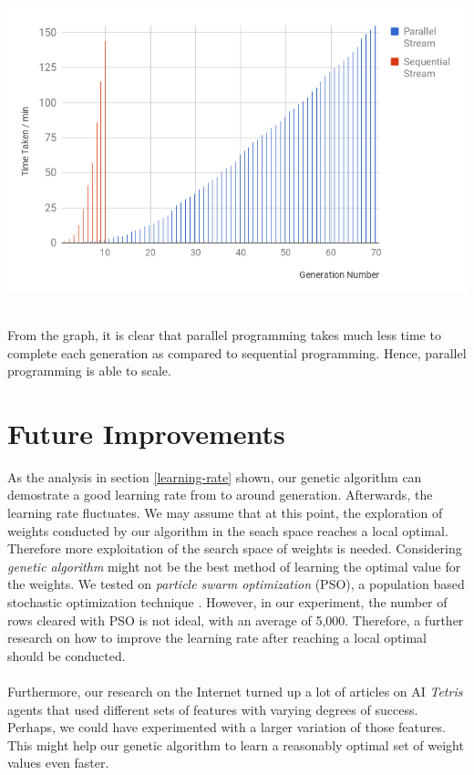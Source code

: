 \documentclass{article} %
\begin{document}
\begin{multicols}{2}
\begin{center}
\begin{minipage}{1.0\linewidth}
\includegraphics[width=\linewidth]{para_seq.png}
\end{minipage}
\end{center}

\noindent
\\
From the graph, it is clear that parallel programming takes much less time to complete each generation as compared to sequential programming. Hence, parallel programming is able to scale.

\section{Future Improvements}
As the analysis in section \ref{learning-rate} shown, our genetic algorithm can demostrate a good learning rate from  to around  generation. Afterwards, the learning rate fluctuates. We may assume that at this point, the exploration of weights conducted by our algorithm in the seach space reaches a local optimal.  Therefore more exploitation of the search space of weights is needed. Considering \textsl{genetic algorithm} might not be the best method of learning the optimal value for the weights. We tested on \textsl{particle swarm optimization} (PSO), a population based stochastic optimization technique \cite{PSO}. However, in our experiment, the number of rows cleared with PSO is not ideal, with an average of 5,000. Therefore, a further research on how to improve the learning rate after reaching a local optimal should be conducted. \\
\\
\noindent
Furthermore, our research on the Internet turned up a lot of articles on AI \textit{Tetris} agents that used different sets of features with varying degrees of success. Perhaps, we could have experimented with a larger variation of those features. This might help our genetic algorithm to learn a reasonably optimal set of weight values even faster.


\end{multicols}
\end{document}
